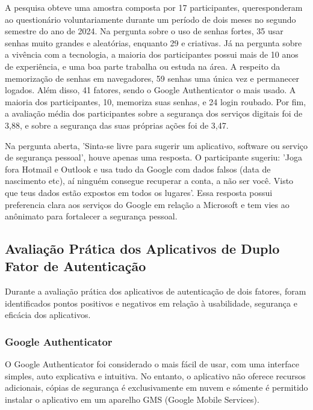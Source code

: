 \documentclass[12pt]{article}
\begin{document}
A pesquisa obteve uma amostra composta por 17 participantes, queresponderam
ao questionário voluntariamente durante um período de dois meses no segundo
semestre do ano de 2024.
Na pergunta sobre o uso de senhas fortes, 35%
usar senhas muito grandes e aleatórias, enquanto 29%
e criativas.
Já na pergunta sobre a vivência com a tecnologia, a maioria dos
participantes possui mais de 10 anos de experiência, e uma boa parte
trabalha ou estuda na área.
A respeito da memorização de senhas em navegadores, 59%
senhas uma única vez e permanecer logados.
Além disso, 41%
fatores, sendo o Google Authenticator o mais usado.
A maioria dos participantes, 10, memoriza suas senhas, e 24%
login roubado.
Por fim, a avaliação média dos participantes sobre a segurança dos serviços
digitais foi de 3,88, e sobre a segurança das suas próprias ações foi de
3,47.

Na pergunta aberta, 'Sinta-se livre para sugerir um aplicativo, software ou
serviço de segurança pessoal', houve apenas uma resposta.
O participante sugeriu: 'Joga fora Hotmail e Outlook e usa tudo da Google com
dados falsos (data de nascimento etc), aí ninguém consegue recuperar a conta,
a não ser você.
Visto que teus dados estão expostos em todos os lugares'.
Essa resposta possui preferencia clara aos serviços do Google em relação a
Microsoft e tem vies ao anônimato para fortalecer a segurança pessoal.

\subsection{Avaliação Prática dos Aplicativos de Duplo Fator de Autenticação}

Durante a avaliação prática dos aplicativos de autenticação de dois fatores,
foram identificados pontos positivos e negativos em relação à usabilidade,
segurança e eficácia dos aplicativos.

\subsubsection{Google Authenticator}

O Google Authenticator foi considerado o mais fácil de usar, com uma
interface simples, auto explicativa e intuitiva.
No entanto, o aplicativo não oferece recursos adicionais, cópias de segurança
é exclusivamente em nuvem e sómente é permitido instalar o aplicativo em um
aparelho GMS (Google Mobile Services).
\end{document}

